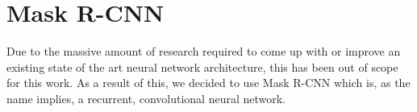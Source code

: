 \section{Mask R-CNN}
Due to the massive amount of research required to come up with or improve an existing state of the art neural network architecture,
this has been out of scope for this work. As a result of this, we decided to use Mask R-CNN \cite{He.20170405} which is, as the name implies, a recurrent, convolutional neural network.